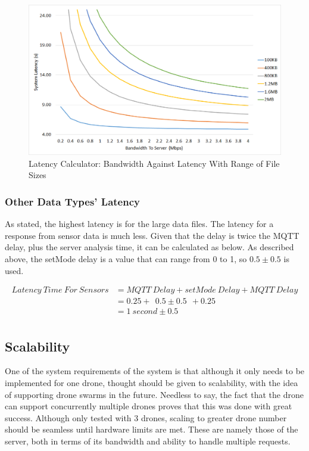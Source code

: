 \documentclass{article}
\begin{document}
\begin{figure}[h]
\caption{Latency Calculator: Bandwidth Against Latency With Range of File Sizes\label{fig:LatencyVsBandwidth}}
\includegraphics[width=\textwidth]{LatencyVsBandwidth}
\end{figure}

\subsubsection{Other Data Types' Latency}
As stated, the highest latency is for the large data files. The latency for a response from sensor data is much less. Given that the delay is twice the MQTT delay, plus the server analysis time, it can be calculated as below. As described above, the setMode delay is a value that can range from 0 to 1, so $0.5\pm0.5$ is used.

\begin{equation*}
\begin{split}
Latency\ Time\ For\ Sensors & = MQTT\ Delay + setMode\ Delay + MQTT\ Delay \\
							& = 0.25 +\ \ 0.5 \pm 0.5 \ \ + 0.25 \\
							& = 1\ second \pm 0.5 \\
\end{split}
\end{equation*}

\subsection{Scalability}
One of the system requirements of the system is that although it only needs to be implemented for one drone, thought should be given to scalability, with the idea of supporting drone swarms in the future. Needless to say, the fact that the drone can support concurrently multiple drones proves that this was done with great success. Although only tested with 3 drones, scaling to greater drone number should be seamless until hardware limits are met. These are namely those of the server, both in terms of its bandwidth and ability to handle multiple requests. 
\end{document}
